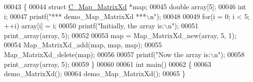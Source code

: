 \begin{DoxyCode}
00043 \{
00044   \textcolor{keyword}{struct }\hyperlink{struct_c___map___matrix_xd}{C\_Map\_MatrixXd} *map;
00045   \textcolor{keywordtype}{double} array[5];
00046   \textcolor{keywordtype}{int} i;
00047   printf(\textcolor{stringliteral}{"*** demo\_Map\_MatrixXd ***\(\backslash\)n"});
00048   
00049   \textcolor{keywordflow}{for}(i = 0; i < 5; ++i) array[i] = i;
00050   printf(\textcolor{stringliteral}{"Initially, the array is:\(\backslash\)n"});
00051   print\_array(array, 5);
00052   
00053   map = Map\_MatrixXd\_new(array, 5, 1);
00054   Map\_MatrixXd\_add(map, map, map);
00055   Map\_MatrixXd\_delete(map);
00056 
00057   printf(\textcolor{stringliteral}{"Now the array is:\(\backslash\)n"});
00058   print\_array(array, 5);
00059 \}
00060 
00061 \textcolor{keywordtype}{int} main()
00062 \{
00063   demo\_MatrixXd();
00064   demo\_Map\_MatrixXd();
00065 \}
\end{DoxyCode}
